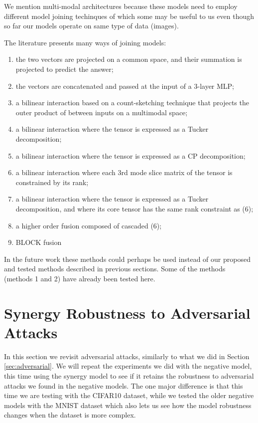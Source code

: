 \documentclass[b5paper]{book}
\let\cite\parencite
\begin{document}
We mention multi-modal architectures because these models need to employ different model joining techinques of which some may be useful to us even though so far our models operate on same type of data (images). 

The literature presents many ways of joining models:

\begin{enumerate}
    \item the two vectors are projected on a common space, and their summation is projected to predict the answer;
    \item the vectors are concatenated and passed at the input
of a 3-layer MLP;
    \item a bilinear interaction based on a count-sketching
technique that projects the outer product of between inputs
on a multimodal space;
    \item a bilinear interaction where the tensor is expressed
as a Tucker decomposition;
    \item a bilinear interaction where the tensor is expressed
as a CP decomposition;
    \item a bilinear interaction where each 3rd mode slice matrix of the tensor is constrained by its rank;
    \item a bilinear interaction where the tensor is expressed
as a Tucker decomposition, and where its core tensor has the
same rank constraint as (6);
    \item a higher order fusion composed of cascaded (6);
    \item BLOCK fusion \cite{ben2019block}
\end{enumerate}

In the future work these methods could perhaps be used instead of our proposed and tested methods described in previous sections. Some of the methods (methods 1 and 2) have already been tested here.

\section{Synergy Robustness to Adversarial Attacks}

In this section we revisit adversarial attacks, similarly to what we did in Section \ref{sec:adversarial}. We will repeat the experiments we did with the negative model, this time using the synergy model to see if it retains the robustness to adversarial attacks we found in the negative models. The one major difference is that this time we are testing with the CIFAR10 dataset, while we tested the older negative models with the MNIST dataset which also lets us see how the model robustness changes when the dataset is more complex.
\end{document}
